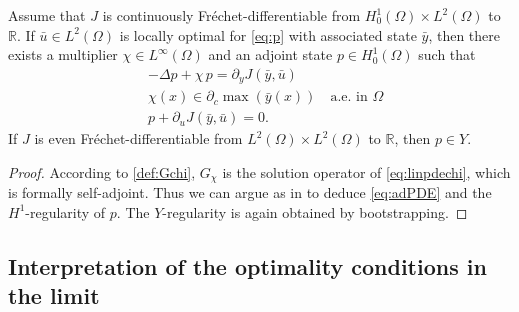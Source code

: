 \documentclass[reqno]{shinyart}
\begin{document}
\begin{corollary}\label{cor:adPDE}
    Assume that $J$ is continuously Fr\'echet-differentiable from $H^1_0(\Omega) \times L^2(\Omega)$ to ${\mathbb{R}}$.
    If $\bar{u} \in L^2(\Omega)$ is locally optimal for \eqref{eq:p} with associated state 
    $\bar{y}$, then there exists a multiplier $\chi\in L^\infty(\Omega)$ and an adjoint state 
    $p\in H^1_0(\Omega)$ such that 
    \begin{subequations}
        \begin{align}
            &-\Delta p + \chi\,p = \partial_y J(\bar{y}, \bar{u}) \label{eq:adPDE}\\
            &\chi(x) \in \partial_c \max(\bar y(x)) \quad \text{a.e.\ in }\Omega\\
            &p + \partial_u J(\bar{y}, \bar{u}) = 0.
        \end{align} 
    \end{subequations}
    If $J$ is even Fr\'echet-differentiable from $L^2(\Omega) \times L^2(\Omega)$ to ${\mathbb{R}}$, then $p \in Y$.
\end{corollary}

\begin{proof}
    According to \cref{def:Gchi}, $G_\chi$ is the solution operator of 
    \eqref{eq:linpdechi}, which is formally self-adjoint. Thus we can argue as in 
    \cite[Sec.~4.6]{Troeltzsch} to deduce \eqref{eq:adPDE} and the $H^1$-regularity of $p$. 
    The $Y$-regularity is again obtained by bootstrapping.
\end{proof}

\subsection{Interpretation of the optimality conditions in the limit}\label{sec:Bstat}
\end{document}

